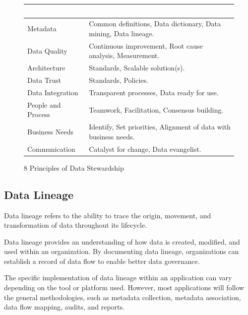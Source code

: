 \begin{figure}[H]
\begin{center}
    \renewcommand{\arraystretch}{1.5}
    \begin{tabular}{|>{\raggedright\arraybackslash}m{4cm}
                    |>{\raggedright\arraybackslash}m{8cm}
                    |}
    \hline
    \rowcolor[HTML]{196fb4}\centering\textcolor{white}{\large Principle} 
                            & \centering\textcolor{white}{\large Description} 
                            \tabularnewline 
    \hline
    Metadata & Common definitions, Data dictionary, Data mining, Data lineage. \\\hline
    Data Quality & Continuous improvement, Root cause analysis, Measurement. \\\hline
    Architecture & Standards, Scalable solution(s). \\\hline
    Data Trust & Standards, Policies. \\\hline
    Data Integration & Transparent processes, Data ready for use. \\\hline
    People and Process & Teamwork, Facilitation, Consensus building. \\\hline
    Business Needs & Identify, Set priorities, Alignment of data with business needs. \\\hline
    Communication & Catalyst for change, Data evangelist.\\\hline
    \end{tabular}
\end{center}
\caption{8 Principles of Data Stewardship}
\label{Data Steward's Job}
\end{figure}

\subsection{Data Lineage}
Data lineage refers to the ability to trace the origin, movement, and transformation of data throughout its lifecycle. 

Data lineage provides an understanding of how data is created, modified, and used within an organization. By documenting data lineage, organizations can establish a record of data flow to enable better data governance. 

The specific implementation of data lineage within an application can vary depending on the tool or platform used. However, most applications will follow the general methodologies, such as metadata collection, metadata association, data flow mapping, audits, and reports.

